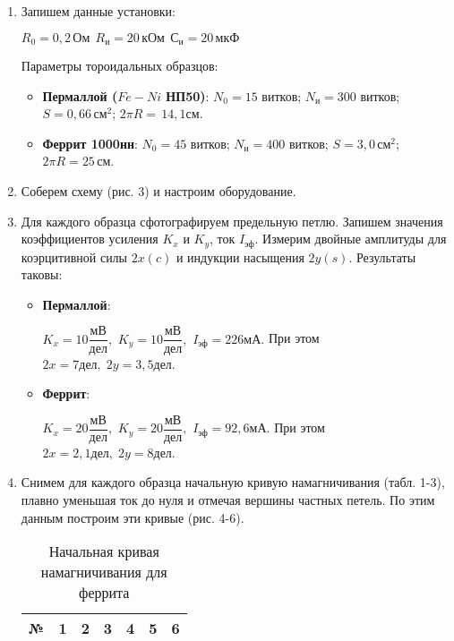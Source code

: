 \begin{enumerate}
	\item Запишем данные установки:
	
	$R_{0}=0,2 \, Ом \ \ R_{и}=20 \, кОм \ \ С_{и}=20 \, мкФ $
	
	Параметры тороидальных образцов:
	
	\begin{itemize}
		
		\item	\textbf{Пермаллой ($ Fe-Ni $  НП50)}: $N_{0}=15$ витков;
		$N_{и}=300$ витков;
		$S=0,66 \, см^{2}$;
		$2\pi R = \, 14,1 см $.  
		
		\item	\textbf{Феррит 1000нн}: $N_{0}=45$ витков;
		$N_{и}=400$ витков;
		$S=3,0 \, см^{2}$;
		$2\pi R = 25 \, см $.  
	\end{itemize}
	
	
	\item Соберем схему (рис. 3) и настроим оборудование. 	
	
	\item Для каждого образца сфотографируем предельную петлю. Запишем значения коэффициентов усиления $K_{x}$ и $K_{y}$, ток $I_{эф}$. Измерим двойные амплитуды для коэрцитивной силы $2x(c)$ и индукции насыщения $2y(s)$. Результаты таковы:
	
	\begin{itemize}
		
		\item 	\textbf{Пермаллой}:
		
		$K_{x}=10 \dfrac{мВ}{дел},$
		$K_{y}=10 \dfrac{мВ}{дел},$
		$I_{эф}=226 мА. $
		При этом $ 2x = 7 дел, \; 2y = 3,5 дел$.
		
		\item 	 \textbf{Феррит}:
		
		$K_{x}=20 \dfrac{мВ}{дел},$
		$K_{y}=20 \dfrac{мВ}{дел},$
		$I_{эф}=92,6 мА. $
		При этом $ 2x = 2,1 дел, \; 2y = 8 дел$.
		
		\newpage
		
		
	\end{itemize}
	
	
	
	\item Снимем для каждого образца начальную кривую намагничивания (табл. 1-3), плавно уменьшая ток до нуля и отмечая вершины частных петель. По этим данным построим эти кривые (рис. 4-6).
	
	\begin{table}[h!]
		\caption{Начальная кривая намагничивания для феррита}
		\begin{center}
			\begin{tabular}{|c|c|c|c|c|c|c|} 
				\hline 
				№ &  1 &  2 & 3 & 4 & 5 &  6   \\ 	\hline
				

\end{tabular}
\end{center}
\end{table}
\end{enumerate}
